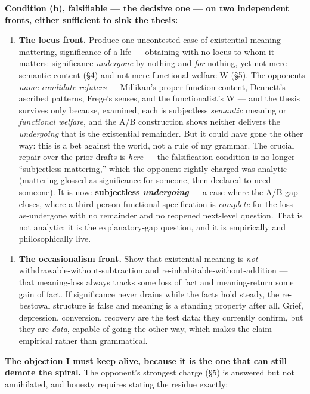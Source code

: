 \documentclass[11pt]{article}
\begin{document}
\textbf{Condition (b), falsifiable — the decisive one — on two independent fronts, either sufficient to sink the thesis:}

\begin{enumerate}
\item \textbf{The locus front.} Produce one uncontested case of existential meaning — mattering, significance-of-a-life — obtaining with no locus to whom it matters: significance \emph{undergone} by nothing and \emph{for} nothing, yet not mere semantic content (§4) and not mere functional welfare W (§5). The opponents \emph{name candidate refuters} — Millikan's proper-function content, Dennett's ascribed patterns, Frege's senses, and the functionalist's W — and the thesis survives only because, examined, each is subjectless \emph{semantic} meaning or \emph{functional welfare}, and the A/\allowbreak{}B construction shows neither delivers the \emph{undergoing} that is the existential remainder. But it could have gone the other way: this is a bet against the world, not a rule of my grammar. The crucial repair over the prior drafts is \emph{here} — the falsification condition is no longer ``subjectless mattering,'' which the opponent rightly charged was analytic (mattering glossed as significance-for-someone, then declared to need someone). It is now: \textbf{subjectless \emph{undergoing}} — a case where the A/\allowbreak{}B gap closes, where a third-person functional specification is \emph{complete} for the loss-as-undergone with no remainder and no reopened next-level question. That is not analytic; it is the explanatory-gap question, and it is empirically and philosophically live.
\end{enumerate}

\begin{enumerate}
\item \textbf{The occasionalism front.} Show that existential meaning is \emph{not} withdrawable-without-subtraction and re-inhabitable-without-addition — that meaning-loss always tracks some loss of fact and meaning-return some gain of fact. If significance never drains while the facts hold steady, the re-bestowal structure is false and meaning is a standing property after all. Grief, depression, conversion, recovery are the test data; they currently confirm, but they are \emph{data}, capable of going the other way, which makes the claim empirical rather than grammatical.
\end{enumerate}

\textbf{The objection I must keep alive, because it is the one that can still demote the spiral.} The opponent's strongest charge (§5) is answered but not annihilated, and honesty requires stating the residue exactly:
\end{document}
